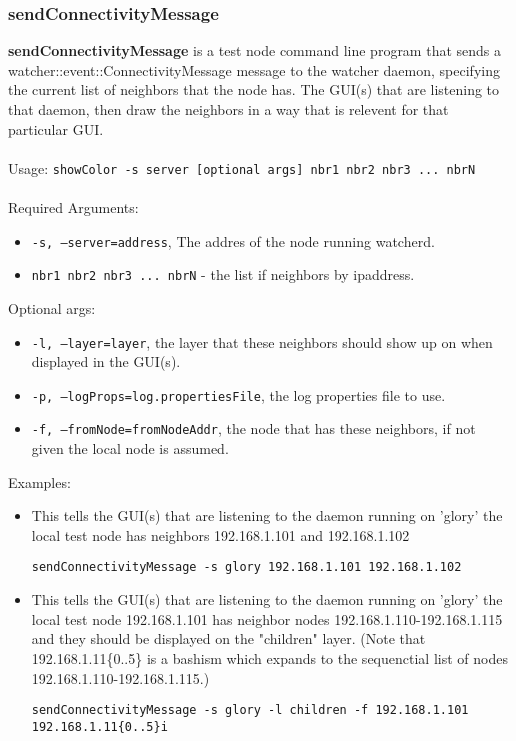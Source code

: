 \newpage
\label{sendConnectivityMessage}
\subsubsection{sendConnectivityMessage}
{\bf sendConnectivityMessage} is a test node command line program that sends a watcher::event::ConnectivityMessage message to the watcher daemon, specifying the current list of neighbors that the node has. 
The GUI(s) that are listening to that daemon, then draw the neighbors in a way that is relevent for that particular GUI.
\\\\
Usage: 
{\tt showColor -s server [optional args] nbr1 nbr2 nbr3 ... nbrN}
\\\\
Required Arguments: 
\begin{itemize}
\item {\tt -s, --server=address}, The addres of the node running watcherd.
\item {\tt nbr1 nbr2 nbr3 ... nbrN} - the list if neighbors by ipaddress.
\end{itemize}
Optional args:
\begin{itemize}
\item {\tt -l, --layer=layer}, the layer that these neighbors should show up on when displayed in the GUI(s).
\item {\tt -p, --logProps=log.propertiesFile}, the log properties file to use.
\item {\tt -f, --fromNode=fromNodeAddr}, the node that has these neighbors, if not given the local node is assumed.
\end{itemize}
Examples:
\begin{itemize}

\item This tells the GUI(s) that are listening to the daemon running on 'glory' the local test node has neighbors 192.168.1.101 and 192.168.1.102

{\tt sendConnectivityMessage -s glory 192.168.1.101 192.168.1.102}

\item This tells the GUI(s) that are listening to the daemon running on 'glory' the local test node 192.168.1.101 has neighbor nodes 192.168.1.110-192.168.1.115 and they should be displayed on the "children" layer. (Note that 192.168.1.11\{0..5\} is a bashism which expands to the sequenctial list of nodes 192.168.1.110-192.168.1.115.) 

{\tt sendConnectivityMessage -s glory -l children -f 192.168.1.101 192.168.1.11\{0..5\}i}

\end{itemize}
